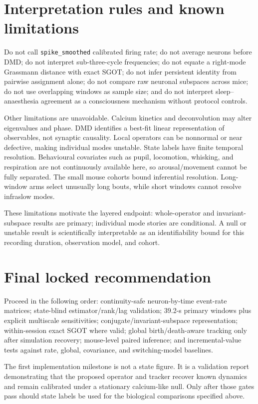 \documentclass[11pt,a4paper]{article}
\begin{document}
\section{Interpretation rules and known limitations}

\begin{stopbox}
Do not call \texttt{spike\_smoothed} calibrated firing rate; do not average neurons before DMD; do not interpret sub-three-cycle frequencies; do not equate a right-mode Grassmann distance with exact SGOT; do not infer persistent identity from pairwise assignment alone; do not compare raw neuronal subspaces across mice; do not use overlapping windows as sample size; and do not interpret sleep--anaesthesia agreement as a consciousness mechanism without protocol controls.
\end{stopbox}

Other limitations are unavoidable. Calcium kinetics and deconvolution may alter eigenvalues and phase. DMD identifies a best-fit linear representation of observables, not synaptic causality. Local operators can be nonnormal or near defective, making individual modes unstable. State labels have finite temporal resolution. Behavioural covariates such as pupil, locomotion, whisking, and respiration are not continuously available here, so arousal/movement cannot be fully separated. The small mouse cohorts bound inferential resolution. Long-window arms select unusually long bouts, while short windows cannot resolve infraslow modes.

These limitations motivate the layered endpoint: whole-operator and invariant-subspace results are primary; individual mode stories are conditional. A null or unstable result is scientifically interpretable as an identifiability bound for this recording duration, observation model, and cohort.

\section{Final locked recommendation}

Proceed in the following order: continuity-safe neuron-by-time event-rate matrices; state-blind estimator/rank/lag validation; 39.2-s primary windows plus explicit multiscale sensitivities; conjugate/invariant-subspace representation; within-session exact SGOT where valid; global birth/death-aware tracking only after simulation recovery; mouse-level paired inference; and incremental-value tests against rate, global, covariance, and switching-model baselines.

The first implementation milestone is not a state figure. It is a validation report demonstrating that the proposed operator and tracker recover known dynamics and remain calibrated under a stationary calcium-like null. Only after those gates pass should state labels be used for the biological comparisons specified above.

\clearpage
\sloppy


\end{document}
